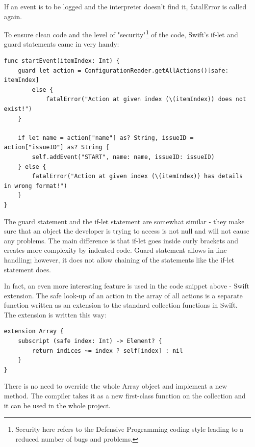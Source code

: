 If an event is to be logged and the interpreter doesn't find it, fatalError is called again.

\newpage

To ensure clean code and the level of "security"\footnote{Security here refers to the Defensive Programming coding style leading to a reduced number of bugs and problems.} of the code, Swift's if-let and guard statements came in very handy:

\bigbreak

\begin{lstlisting}
func startEvent(itemIndex: Int) {
	guard let action = ConfigurationReader.getAllActions()[safe: itemIndex]
		else {
			fatalError("Action at given index (\(itemIndex)) does not exist!")
	}
        
	if let name = action["name"] as? String, issueID = action["issueID"] as? String {
		self.addEvent("START", name: name, issueID: issueID)
	} else {
		fatalError("Action at given index (\(itemIndex)) has details in wrong format!")
	}
}
\end{lstlisting}	

\bigbreak

The guard statement and the if-let statement are somewhat similar - they make sure that an object the developer is trying to access is not null and will not cause any problems. The main difference is that if-let goes inside curly brackets and creates more complexity by indented code. Guard statement allows in-line handling; however, it does not allow chaining of the statements like the if-let statement does.

In fact, an even more interesting feature is used in the code snippet above - Swift extension. The safe look-up of an action in the array of all actions is a separate function written as an extension to the standard collection functions in Swift. The extension is written this way:

\bigbreak

\begin{lstlisting}
extension Array {
    subscript (safe index: Int) -> Element? {
        return indices ~= index ? self[index] : nil
    }
}
\end{lstlisting}	

\bigbreak

There is no need to override the whole Array object and implement a new method. The compiler takes it as a new first-class function on the collection and it can be used in the whole project.

\newpage

